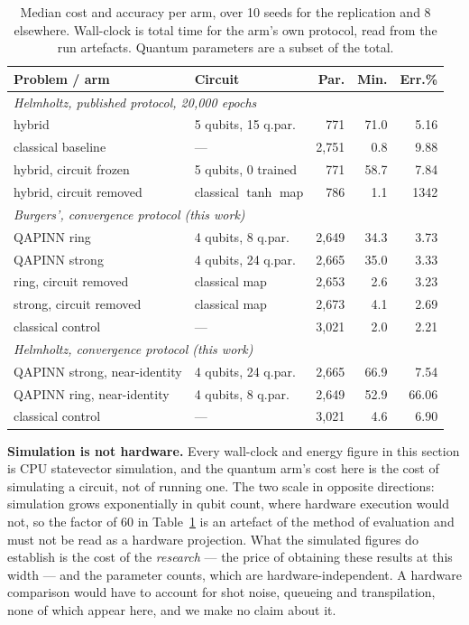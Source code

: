 \documentclass[conference,a4paper]{IEEEtran}
\begin{document}
\begin{table}[t]
\caption{Median cost and accuracy per arm, over 10 seeds for the replication and 8
elsewhere. Wall-clock is total time for the arm's own protocol, read from the run
artefacts. Quantum parameters are a subset of the total.}
\label{tab:cost}
\centering
\scriptsize
\setlength{\tabcolsep}{1.5pt}
\begin{tabular}{llrrr}
\hline
\textbf{Problem / arm} & \textbf{Circuit} & \textbf{Par.} & \textbf{Min.} & \textbf{Err.\%} \\
\hline
\multicolumn{5}{l}{\emph{Helmholtz, published protocol, 20{,}000 epochs}~\cite{qcpinn}} \\
\quad hybrid & 5 qubits, 15 q.par. & 771 & 71.0 & 5.16 \\
\quad classical baseline & --- & 2{,}751 & 0.8 & 9.88 \\
\quad hybrid, circuit frozen & 5 qubits, 0 trained & 771 & 58.7 & 7.84 \\
\quad hybrid, circuit removed & classical $\tanh$ map & 786 & 1.1 & 1342 \\
\hline
\multicolumn{5}{l}{\emph{Burgers', convergence protocol (this work)}} \\
\quad QAPINN ring & 4 qubits, 8 q.par. & 2{,}649 & 34.3 & 3.73 \\
\quad QAPINN strong & 4 qubits, 24 q.par. & 2{,}665 & 35.0 & 3.33 \\
\quad ring, circuit removed & classical map & 2{,}653 & 2.6 & 3.23 \\
\quad strong, circuit removed & classical map & 2{,}673 & 4.1 & 2.69 \\
\quad classical control & --- & 3{,}021 & 2.0 & 2.21 \\
\hline
\multicolumn{5}{l}{\emph{Helmholtz, convergence protocol (this work)}} \\
\quad QAPINN strong, near-identity & 4 qubits, 24 q.par. & 2{,}665 & 66.9 & 7.54 \\
\quad QAPINN ring, near-identity & 4 qubits, 8 q.par. & 2{,}649 & 52.9 & 66.06 \\
\quad classical control & --- & 3{,}021 & 4.6 & 6.90 \\
\hline
\end{tabular}
\end{table}

\textbf{Simulation is not hardware.} Every wall-clock and energy figure in this section is
CPU statevector simulation, and the quantum arm's cost here is the cost of simulating a
circuit, not of running one. The two scale in opposite directions: simulation grows
exponentially in qubit count, where hardware execution would not, so the factor of 60 in
Table~\ref{tab:cost} is an artefact of the method of evaluation and must not be read as a
hardware projection. What the simulated figures do establish is the cost of the
\emph{research} --- the price of obtaining these results at this width --- and the
parameter counts, which are hardware-independent. A hardware comparison would have to
account for shot noise, queueing and transpilation, none of which appear here, and we make
no claim about it.
\end{document}
